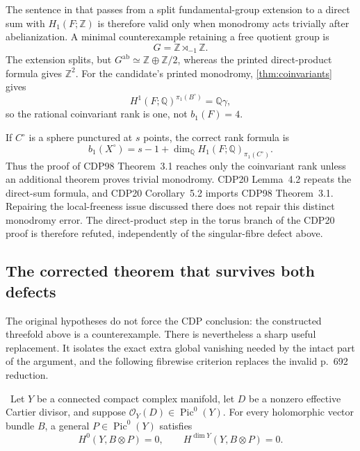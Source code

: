 The sentence in \cite[Lemma~3.2, pp.~84--85]{CDP1998} that passes from a
split fundamental-group extension to a direct sum with $H_1(F;\mathbb Z)$
is therefore valid only when monodromy acts trivially after abelianization.
A minimal counterexample retaining a free quotient group is
\[
G=\mathbb Z\rtimes_{-1}\mathbb Z.
\]
The extension splits, but
$G^{\mathrm{ab}}\simeq\mathbb Z\oplus\mathbb Z/2$, whereas the printed
direct-product formula gives $\mathbb Z^2$.
For the candidate's printed monodromy, \cref{thm:coinvariants} gives
\[
H^1(F;\mathbb Q)^{\pi_1(B^\circ)}=\mathbb Q\gamma,
\]
so the rational coinvariant rank is one, not
$b_1(F)=4$.

If $C^\circ$ is a sphere punctured at $s$ points, the correct rank formula is
\[
b_1(X^\circ)=s-1+
\dim_{\mathbb Q}H_1(F;\mathbb Q)_{\pi_1(C^\circ)}.
\tag{5.22}
\]
Thus the proof of CDP98 Theorem~3.1 reaches only the coinvariant rank unless
an additional theorem proves trivial monodromy.  CDP20 Lemma~4.2 repeats the
direct-sum formula, and CDP20 Corollary~5.2 imports CDP98 Theorem~3.1.
Repairing the local-freeness issue discussed there does not repair this
distinct monodromy error.  The direct-product step in the torus branch of the
CDP20 proof is therefore refuted, independently of the singular-fibre defect
above.

\subsection{The corrected theorem that survives both defects}

The original hypotheses do not force the CDP conclusion: the constructed
threefold above is a counterexample.  There is nevertheless a sharp useful
replacement.  It isolates the exact extra global vanishing needed by the
intact part of the argument, and the following fibrewise criterion replaces
the invalid p.~692 reduction.

\begin{lemma}\label{lem:cdp-generic-endpoints}
\Verified\ Let \(Y\) be a connected compact complex manifold, let \(D\) be
a nonzero effective Cartier divisor, and suppose
\(\mathcal O_Y(D)\in\operatorname{Pic}^0(Y)\).  For every holomorphic vector
bundle \(B\), a general \(P\in\operatorname{Pic}^0(Y)\) satisfies
\[
 H^0(Y,B\otimes P)=0,\qquad
 H^{\dim Y}(Y,B\otimes P)=0.
\tag{5.23}
\]
\end{lemma}

